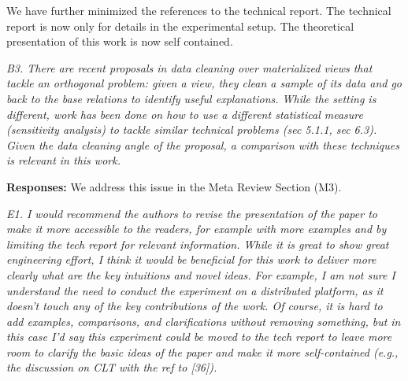 We have further minimized the references to the technical report. The technical report is now only for details in the experimental setup. The theoretical presentation of this work is now self contained.

\vspace{1em}
\emph{B3. There are recent proposals in data cleaning over materialized views that tackle an orthogonal problem: given a view, they clean a sample of its data and go back to the base relations to identify useful explanations. While the setting is different, work has been done on how to use a different statistical measure (sensitivity analysis) to tackle similar technical problems (sec 5.1.1, sec 6.3). Given the data cleaning angle of the proposal, a comparison with these techniques is relevant in this work.}

\vspace{.25em}

{\bf Responses:} We address this issue in the Meta Review Section (M3).

\vspace{1em}
\emph{E1. I would recommend the authors to revise the presentation of the paper to make it more accessible to the readers, for example with more examples and by limiting the tech report for relevant information. While it is great to show great engineering effort, I think it would be beneficial for this work to deliver more clearly what are the key intuitions and novel ideas. For example, I am not sure I understand the need to conduct the experiment on a distributed platform, as it doesn't touch any of the key contributions of the work. Of course, it is hard to add examples, comparisons, and clarifications without removing something, but in this case I'd say this experiment could be moved to the tech report to leave more room to clarify the basic ideas of the paper and make it more self-contained (e.g., the discussion on CLT with the ref to [36]).}

\vspace{.25em}

